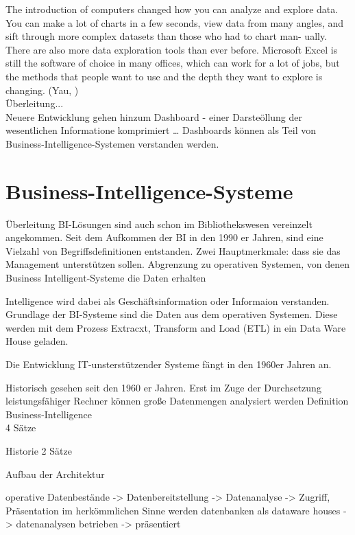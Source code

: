 The introduction of computers changed how you can analyze and explore data. You can make a lot of charts in a few seconds, view data from many angles, 
and sift through more complex datasets than those who had to chart man- ually. There are also more data exploration tools than ever before. 
Microsoft Excel is still the software of choice in many offices, which can work for a lot of jobs, 
but the methods that people want to use and the depth they want to explore is changing. (Yau, )\\
Überleitung...\\
Neuere Entwicklung gehen hinzum Dashboard  - einer Darsteöllung der wesentlichen Informatione komprimiert \dots
Dashboards können  als Teil von Business-Intelligence-Systemen verstanden werden.
\section{Business-Intelligence-Systeme}

\cite{kemper_business_2010}
\cite{gluchowski_management_2008}
Überleitung BI-Lösungen sind auch schon im Bibliothekswesen vereinzelt angekommen.
Seit dem Aufkommen der \acrfull{BI} in den 1990 er Jahren, sind eine Vielzahl von Begriffsdefinitionen entstanden.
Zwei Hauptmerkmale: dass sie das Management unterstützen sollen. \cite{linden_geschaftsmodellbasierte_2016}
Abgrenzung zu operativen Systemen, von denen Business Intelligent-Systeme die Daten erhalten \cite{abts_grundkurs_2017}

Intelligence wird dabei als Geschäftsinformation oder Informaion verstanden.\cite{linden_geschaftsmodellbasierte_2016}
Grundlage der BI-Systeme sind die Daten aus dem operativen Systemen. Diese werden mit dem Prozess Extracxt, Transform and Load (ETL) in ein 
Data Ware House geladen. 

Die Entwicklung IT-unsterstützender Systeme fängt in den 1960er Jahren an.


Historisch gesehen seit den 1960 er Jahren. Erst im Zuge der Durchsetzung leistungsfähiger Rechner können große Datenmengen analysiert werden
Definition Business-Intelligence\\
4 Sätze

Historie
2 Sätze

Aufbau der Architektur 

operative Datenbestände -> Datenbereitstellung -> Datenanalyse -> Zugriff, Präsentation
im herkömmlichen Sinne werden datenbanken als dataware houses -> datenanalysen betrieben -> präsentiert

